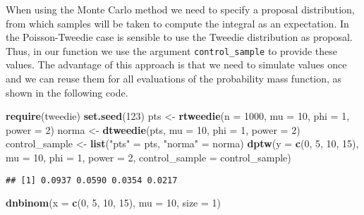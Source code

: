 \documentclass[9pt,a5paper,]{book}
\newenvironment{Shaded}{}{}
\newcommand{\KeywordTok}[1]{\textbf{{#1}}}
\newcommand{\DataTypeTok}[1]{\underline{{#1}}}
\newcommand{\DecValTok}[1]{{#1}}
\newcommand{\StringTok}[1]{{#1}}
\newcommand{\NormalTok}[1]{{#1}}
\renewenvironment{Shaded}{\color{inputcolor}}{}
\renewcommand{\DataTypeTok}[1]{{#1}}
\theoremstyle{definition}
\theoremstyle{definition}
\theoremstyle{remark}
\begin{document}
When using the Monte Carlo method we need to specify a proposal
distribution, from which samples will be taken to compute the integral
as an expectation. In the Poisson-Tweedie case is sensible to use the
Tweedie distribution as proposal. Thus, in our function we use the
argument \texttt{control\_sample} to provide these values. The advantage
of this approach is that we need to simulate values once and we can
reuse them for all evaluations of the probability mass function, as
shown in the following code.

\begin{Shaded}
\begin{Highlighting}[]
\KeywordTok{require}\NormalTok{(tweedie)}
\KeywordTok{set.seed}\NormalTok{(}\DecValTok{123}\NormalTok{)}
\NormalTok{pts <-}\StringTok{ }\KeywordTok{rtweedie}\NormalTok{(}\DataTypeTok{n =} \DecValTok{1000}\NormalTok{, }\DataTypeTok{mu =} \DecValTok{10}\NormalTok{, }\DataTypeTok{phi =} \DecValTok{1}\NormalTok{, }\DataTypeTok{power =} \DecValTok{2}\NormalTok{)}
\NormalTok{norma <-}\StringTok{ }\KeywordTok{dtweedie}\NormalTok{(pts, }\DataTypeTok{mu =} \DecValTok{10}\NormalTok{, }\DataTypeTok{phi =} \DecValTok{1}\NormalTok{, }\DataTypeTok{power =} \DecValTok{2}\NormalTok{)}
\NormalTok{control_sample <-}\StringTok{ }\KeywordTok{list}\NormalTok{(}\StringTok{"pts"} \NormalTok{=}\StringTok{ }\NormalTok{pts, }\StringTok{"norma"} \NormalTok{=}\StringTok{ }\NormalTok{norma) }
\KeywordTok{dptw}\NormalTok{(}\DataTypeTok{y =} \KeywordTok{c}\NormalTok{(}\DecValTok{0}\NormalTok{, }\DecValTok{5}\NormalTok{, }\DecValTok{10}\NormalTok{, }\DecValTok{15}\NormalTok{), }\DataTypeTok{mu =} \DecValTok{10}\NormalTok{, }\DataTypeTok{phi =} \DecValTok{1}\NormalTok{, }\DataTypeTok{power =} \DecValTok{2}\NormalTok{, }
     \DataTypeTok{control_sample =} \NormalTok{control_sample)}
\end{Highlighting}
\end{Shaded}

\begin{verbatim}
## [1] 0.0937 0.0590 0.0354 0.0217
\end{verbatim}

\begin{Shaded}
\begin{Highlighting}[]
\KeywordTok{dnbinom}\NormalTok{(}\DataTypeTok{x =} \KeywordTok{c}\NormalTok{(}\DecValTok{0}\NormalTok{, }\DecValTok{5}\NormalTok{, }\DecValTok{10}\NormalTok{, }\DecValTok{15}\NormalTok{), }\DataTypeTok{mu =} \DecValTok{10}\NormalTok{, }\DataTypeTok{size =} \DecValTok{1}\NormalTok{)}
\end{Highlighting}
\end{Shaded}
\end{document}
